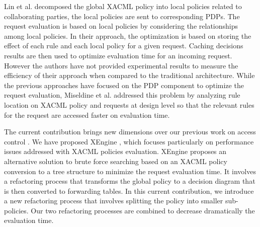 Lin et al. \cite{decomposition} decomposed the global XACML policy into local policies related to collaborating parties, the local policies 
are sent to corresponding PDPs. The request evaluation is based on local policies by considering the relationships among local
 policies. In their approach, the optimization is based on storing the effect of each rule and each local policy for 
a given request. Caching decisions results are then used to optimize evaluation time for an incoming request. However the authors have 
not provided experimental results to measure the efficiency of their approach when compared to the traditional architecture.  
While the previous approaches have focused on the PDP component to optimize the request evaluation, Miseldine et al. \cite{XACMLstructure} addressed this problem by 
analyzing rule location on XACML policy and requests at design level so that the relevant rules for the request are accessed faster on evaluation time. 


The current contribution brings new dimensions over our previous work on access control \cite{Xengine, testcase, models}.
We have proposed XEngine \cite{Xengine}, which focuses particularly on performance issues addressed with XACML policies evaluation. XEngine proposes an 
alternative solution to brute force searching based on an XACML policy conversion to a tree structure to minimize the request evaluation time. 
It involves a refactoring process that transforms the global policy to a decision diagram that is then converted to 
forwarding tables. In this current contribution, we introduce a new refactoring process that involves splitting the policy into smaller sub-policies. Our 
two refactoring processes are combined to decrease dramatically the evaluation time. 

